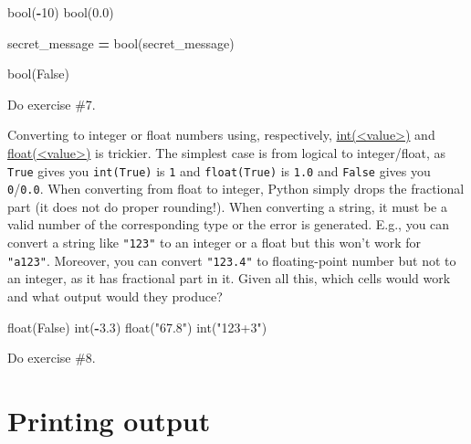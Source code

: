 \documentclass[
]{book}
\newenvironment{Shaded}{\begin{snugshade}}{\end{snugshade}}
\newcommand{\BuiltInTok}[1]{#1}
\newcommand{\DecValTok}[1]{\textcolor[rgb]{0.00,0.00,0.81}{#1}}
\newcommand{\FloatTok}[1]{\textcolor[rgb]{0.00,0.00,0.81}{#1}}
\newcommand{\NormalTok}[1]{#1}
\newcommand{\OperatorTok}[1]{\textcolor[rgb]{0.81,0.36,0.00}{\textbf{#1}}}
\newcommand{\StringTok}[1]{\textcolor[rgb]{0.31,0.60,0.02}{#1}}
\newcommand{\VariableTok}[1]{\textcolor[rgb]{0.00,0.00,0.00}{#1}}
\begin{document}
\begin{Shaded}
\begin{Highlighting}[]
\BuiltInTok{bool}\NormalTok{(}\OperatorTok{{-}}\DecValTok{10}\NormalTok{)}
\BuiltInTok{bool}\NormalTok{(}\FloatTok{0.0}\NormalTok{)}

\NormalTok{secret\_message }\OperatorTok{=} \StringTok{\textquotesingle{}\textquotesingle{}}
\BuiltInTok{bool}\NormalTok{(secret\_message)}

\BuiltInTok{bool}\NormalTok{(}\StringTok{\textquotesingle{}False\textquotesingle{}}\NormalTok{)}
\end{Highlighting}
\end{Shaded}

Do exercise \#7.

Converting to integer or float numbers using, respectively, \href{https://docs.python.org/3/library/functions.html\#int}{int(\textless value\textgreater)} and \href{https://docs.python.org/3/library/functions.html\#float}{float(\textless value\textgreater)} is trickier. The simplest case is from logical to integer/float, as \texttt{True} gives you \texttt{int(True)} is \texttt{1} and \texttt{float(True)} is \texttt{1.0} and \texttt{False} gives you \texttt{0}/\texttt{0.0}. When converting from float to integer, Python simply drops the fractional part (it does not do proper rounding!). When converting a string, it must be a valid number of the corresponding type or the error is generated. E.g., you can convert a string like \texttt{"123"} to an integer or a float but this won't work for \texttt{"a123"}. Moreover, you can convert \texttt{"123.4"} to floating-point number but not to an integer, as it has fractional part in it. Given all this, which cells would work and what output would they produce?

\begin{Shaded}
\begin{Highlighting}[]
\BuiltInTok{float}\NormalTok{(}\VariableTok{False}\NormalTok{)}
\BuiltInTok{int}\NormalTok{(}\OperatorTok{{-}}\FloatTok{3.3}\NormalTok{)}
\BuiltInTok{float}\NormalTok{(}\StringTok{"67.8"}\NormalTok{)}
\BuiltInTok{int}\NormalTok{(}\StringTok{"123+3"}\NormalTok{)}
\end{Highlighting}
\end{Shaded}

Do exercise \#8.

\hypertarget{print}{%
\section{Printing output}\label{print}}
\end{document}
